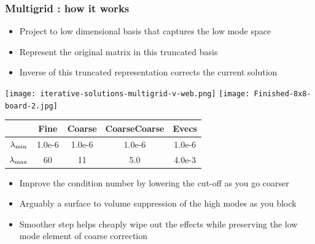 \documentclass[pdf,ps,8pt]{beamer}
\begin{document}
\begin{frame}[fragile]\small\frametitle{Multigrid : how it works}

\begin{itemize}
\item Project to low dimensional basis that captures the low mode space
\item Represent the original matrix in this truncated basis
\item Inverse of this truncated representation corrects the current solution
\end{itemize}
\begin{center}
\texttt{[image: iterative-solutions-multigrid-v-web.png]}
\texttt{[image: Finished-8x8-board-2.jpg]}
\end{center}

\begin{tabular}{c|cccc}
 & Fine & Coarse & CoarseCoarse & Evecs\\
\hline
$\lambda_{\rm min}$ & 1.0e-6 &  1.0e-6 &  1.0e-6  &  1.0e-6  \\
$\lambda_{\rm max}$ & 60     &  11     & 5.0      &  4.0e-3 
\end{tabular}

\begin{itemize}
\item Improve the condition number by lowering the cut-off as you go coarser
\item Arguably a surface to volume suppression of the high modes as you block
\item Smoother step helps cheaply wipe out the effects while preserving the low mode element of coarse
correction
\end{itemize}

\end{frame}
\end{document}
